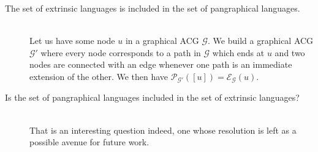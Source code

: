 \begin{description}
  \item[The set of extrinsic languages is included in the set of
    pangraphical languages.] \hfill \\

    Let us have some node $u$ in a graphical ACG $\mathcal{G}$. We build
    a graphical ACG $\mathcal{G}'$ where every node corresponds to a
    path in $\mathcal{G}$ which ends at $u$ and two nodes are connected
    with an edge whenever one path is an immediate extension of the
    other. We then have $\mathcal{P}_{\mathcal{G'}}([u]) =
    \mathcal{E}_{\mathcal{G}}(u)$.

  \item[Is the set of pangraphical languages included in the set of
    extrinsic languages?] \hfill \\

    That is an interesting question indeed, one whose resolution is left
    as a possible avenue for future work.
\end{description}

